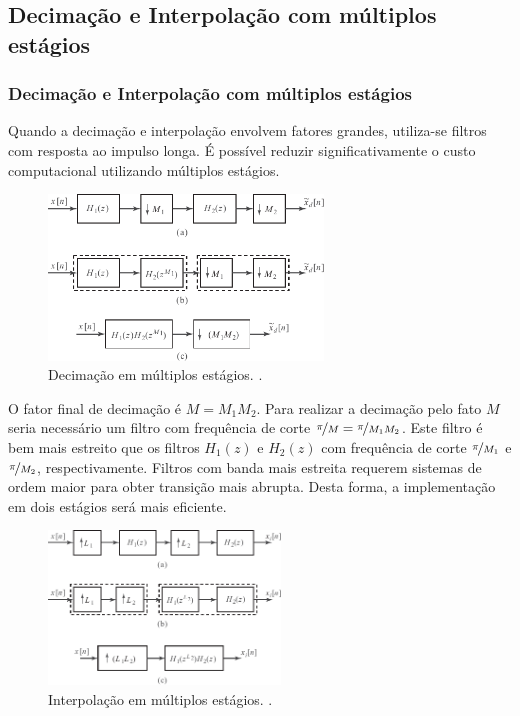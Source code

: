 \subsection{Decimação e Interpolação com múltiplos estágios}
\begin{frame}[allowframebreaks]
  \frametitle{Decimação e Interpolação com múltiplos estágios}
  Quando a decimação e interpolação envolvem fatores grandes, utiliza-se filtros com resposta ao 
  impulso longa. É possível reduzir significativamente o custo computacional utilizando 
  múltiplos estágios.

  \framebreak 

        \begin{figure}[h!]
        \centering
        \includegraphics[width=0.65\textwidth]{images/fig433.pdf}
        \caption{Decimação em múltiplos estágios. \citep{oppenheim2009}.}
        \label{fig:fig433}
        \end{figure}

  O fator final de decimação é $M = M_1 M_2$. Para realizar a decimação pelo fato $M$
  seria necessário um filtro com frequência de corte $\nicefrac{\pi}{M} = \nicefrac{\pi}{M_1 M_2}$.
  Este filtro é bem mais estreito que os filtros $H_1(z)$ e $H_2(z)$ com frequência de corte
  $\nicefrac{\pi}{M_1}$ e $\nicefrac{\pi}{M_2}$, respectivamente. Filtros com banda mais estreita 
  requerem sistemas de ordem maior para obter transição mais abrupta. Desta forma, a implementação
  em dois estágios será mais eficiente.


        \begin{figure}[h!]
        \centering
        \includegraphics[width=0.55\textwidth]{images/fig434.pdf}
        \caption{Interpolação em múltiplos estágios. \citep{oppenheim2009}.}
        \label{fig:fig434}
        \end{figure}

\end{frame}


